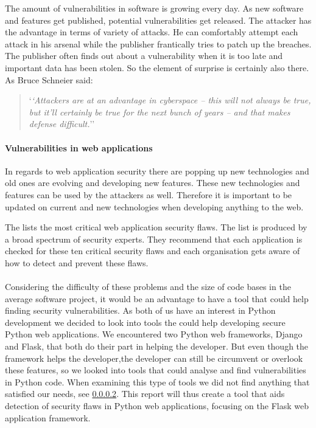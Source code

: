 The amount of vulnerabilities in software is growing every day.
As new software and features get published, potential vulnerabilities get released.
The attacker has the advantage in terms of variety of attacks.
He can comfortably attempt each attack in his arsenal while the publisher frantically tries to patch up the breaches.
The publisher often finds out about a vulnerability when it is too late and important data has been stolen.
So the element of surprise is certainly also there.
As Bruce Schneier said:
\begin{quote}
`\textit{`Attackers are at an advantage in cyberspace – this will not always be true, but it’ll certainly be true for the next bunch of years – and that makes defense difficult.}''\cite{schneier_interview}  
\end{quote}

\paragraph{Vulnerabilities in web applications}
In regards to web application security there are popping up new technologies and old ones are evolving and developing new features.
These new technologies and features can be used by the attackers as well.
Therefore it is important to be updated on current and new technologies when developing anything to the web.\cite{web_security_importance}

The \citet{OWASP10} lists the most critical web application security flaws.
The list is produced by a broad spectrum of security experts. 
They recommend that each application is checked for these ten critical security flaws and each organisation gets aware of how to detect and prevent these flaws.

\paragraph{}
Considering the difficulty of these problems and the size of code bases in the average software project, it would be an advantage to have a tool that could help finding security vulnerabilities.
As both of us have an interest in Python development we decided to look into tools the could help developing secure Python web applications.
We encountered two Python web frameworks, Django and Flask, that both do their part in helping the developer.
But even though the framework helps the developer,the developer can still be circumvent or overlook these features, so we looked into tools that could analyse and find vulnerabilities in Python code.
When examining this type of tools we did not find anything that satisfied our needs, see \cref{}.
This report will thus create a tool that aids detection of security flaws in Python web applications, focusing on the Flask web application framework.
